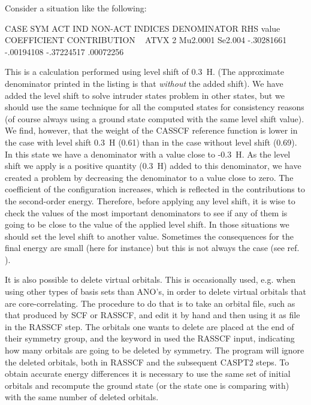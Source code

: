 Consider a situation like the following:

\begin{sourcelisting}
CASE  SYM   ACT IND   NON-ACT INDICES  DENOMINATOR  RHS value  COEFFICIENT CONTRIBUTION
~
ATVX   2   Mu2.0001   Se2.004          -.30281661  -.00194108  -.37224517   .00072256
\end{sourcelisting}

This is a calculation performed using level shift of 0.3~H. (The approximate
denominator printed in the listing is that {\em without} the added shift).
We have added
the level shift to solve intruder states problem in other states, but we
should use the same technique for all the computed states for consistency
reasons (of course always using a ground state computed with the same
level shift value). We find, however, that
the weight of the CASSCF reference function is lower in the case with 
level shift 0.3~H (0.61) than in the case without level shift (0.69).
In this state we have a denominator with
a value close to -0.3~H. As the level shift we apply is a positive 
quantity (0.3~H) added to this denominator, we have created a problem
by decreasing the denominator to a value close to zero. The coefficient
of the configuration increases, which is reflected in the
contributions to the second-order energy. Therefore, before applying
any level shift, it is wise to check the values of the most important
denominators to see if any of them is going to be close to the value
of the applied level shift. In those situations we should set the level
shift to another value. Sometimes the consequences for the final energy
are small (here for instance) but this is not always the case
(see ref. \cite{Roos:96a}).


It is also possible to delete virtual orbitals. This is occasionally
used, e.g. when using other types of basis sets than ANO's, in order
to delete virtual orbitals that are core-correlating.
The procedure to do that is to take an orbital file, such as that
produced by SCF or RASSCF, and edit it by hand and then using it as
 file in the RASSCF step. The orbitals one wants
to delete are placed at the end of their symmetry group, and the 
keyword  in used the RASSCF input, indicating
how many orbitals are going to be deleted by symmetry. The program will
ignore the deleted orbitals, both in RASSCF and the subsequent CASPT2 steps.
To obtain accurate energy differences
it is necessary to use the same set of initial orbitals and recompute the
ground state (or the state one is comparing with) with the same number
of deleted orbitals.

